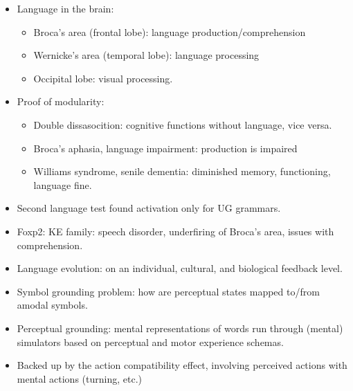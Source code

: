 \documentclass[11pt]{article}
\newenvironment{itemise}{
\begin{itemize}
  \setlength{\itemsep}{1pt}
  \setlength{\parskip}{0pt}
  \setlength{\parsep}{0pt}
}{\end{itemize}}
\begin{document}
\begin{itemise}
\begin{itemise}
 \begin{itemise}
 \item domain specific, innately specified, informationally encapsulated, fast, hardwired, autonomous, not assembled.
 \item Three types: transducers (physical to neural), input system (modular), central system.
 \end{itemise}
 \item Language in the brain:
 \begin{itemise}
 \item Broca's area (frontal lobe): language production/comprehension
 \item Wernicke's area (temporal lobe): language processing
 \item Occipital lobe: visual processing.
 \end{itemise}
 \item Proof of modularity:
  \begin{itemise}
  \item Double dissasocition: cognitive functions without language, vice versa.
  \item Broca's aphasia, language impairment: production is impaired
  \item Williams syndrome, senile dementia: diminished memory, functioning, language fine.
 \end{itemise}
 \item Second language test found activation only for UG grammars.
 \item Foxp2: KE family: speech disorder, underfiring of Broca's area, issues with comprehension.
 \item Language evolution: on an individual, cultural, and biological feedback level.
 \item Symbol grounding problem: how are perceptual states mapped to/from amodal symbols. 
 \item Perceptual grounding: mental representations of words run through (mental) simulators based on perceptual and motor experience schemas. 
 \item Backed up by the action compatibility effect, involving perceived actions with mental actions (turning, etc.)
 \end{itemise}
\end{itemise}
\end{document}
